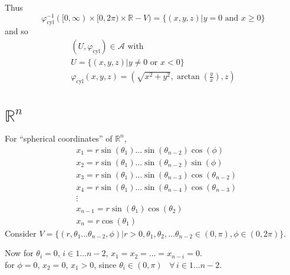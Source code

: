 \documentclass[10pt, twoside]{amsart}
\begin{document}
\begin{multicols*}{2}
Thus
\[
\varphi^{-1}_{\text{cyl}}([0,\infty) \times [0, 2\pi ) \times \mathbb{R} - V) = \lbrace (x,y,z) | y=0\text{ and } x \geq 0 \rbrace
\]
and so 
\begin{equation} \label{Eq:UcylindricalR3}
\begin{gathered}
  (U,\varphi_{\text{cyl}}) \in \mathcal{A} \text{ with } \\ 
  U = \lbrace (x,y,z) | y \neq 0 \text{ or } x <0 \rbrace \\ 
  \varphi_{\text{cyl}}(x,y,z) = ( \sqrt{ x^2 + y^2} , \arctan{ \left( \frac{y}{x} \right) }, z )
\end{gathered}
\end{equation}

\section{$\mathbb{R}^n$}

For ``spherical coordinates'' of $\mathbb{R}^n$, 
\begin{equation}\label{Eq:Rnsphericalcoordinates}
\begin{aligned}
  & x_1  = r\sin{(\theta_1)} \dots \sin{(\theta_{n-2})} \cos{(\phi)} \\ 
  & x_2 = r\sin{(\theta_1)} \dots \sin{(\theta_{n-2}) } \sin{(\phi) } \\ 
  & x_3 = r\sin{ (\theta_1)} \dots \sin{ (\theta_{n-3} ) }\cos{(\theta_{n-2}) } \\ 
  & x_4 = r\sin{ (\theta_1)} \dots \sin{ (\theta_{n-4} ) }\cos{(\theta_{n-3}) } \\ 
  & \vdots \\ 
  & x_{n-1} = r\sin{(\theta_1)} \cos{(\theta_2) } \\ 
  & x_n = r\cos{(\theta_1)}
\end{aligned}
\end{equation}
Consider $V = \lbrace (r, \theta_1 \dots \theta_{n-2}, \phi) | r>0 , \theta_1 , \theta_2, \dots \theta_{n-2} \in (0,\pi) , \phi \in (0,2\pi) \rbrace$.  

Now for $\theta_i =0$, $i\in 1 \dots n-2$, $x_1 = x_2 = \dots = x_{n-i} = 0$.  \\
\phantom{Now } for $\phi=0$, $x_2=0$, $x_1 >0$, since $\theta_i \in (0,\pi)$ \, $\forall \, i \in 1 \dots n-2$.


\end{multicols*}
\end{document}
